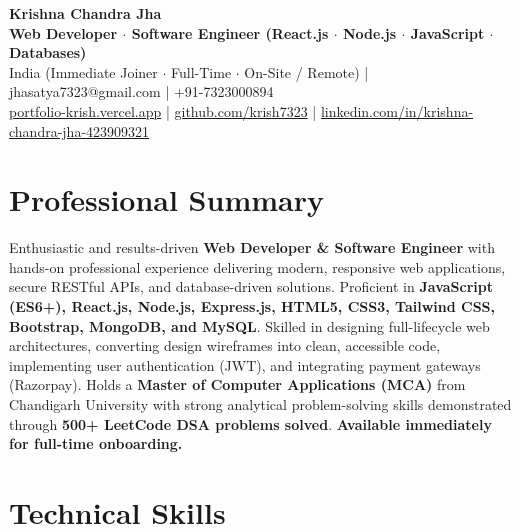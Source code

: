 \documentclass[a4paper,10pt]{article}
\begin{document}
\begin{center}

    {\LARGE \textbf{Krishna Chandra Jha}} \\[2.5pt]

    \textbf{Web Developer $\cdot$ Software Engineer (React.js $\cdot$ Node.js $\cdot$ JavaScript $\cdot$ Databases)} \\[3.5pt]

    India (Immediate Joiner $\cdot$ Full-Time $\cdot$ On-Site / Remote)
    \quad | \quad
    jhasatya7323@gmail.com
    \quad | \quad
    +91-7323000894
    \\[2.5pt]

    \href{https://portfolio-ashen-alpha-dv0whhsamo.vercel.app/}{portfolio-krish.vercel.app}
    \quad | \quad
    \href{https://github.com/krish7323}{github.com/krish7323}
    \quad | \quad
    \href{https://linkedin.com/in/krishna-chandra-jha-423909321}
    {linkedin.com/in/krishna-chandra-jha-423909321}

\end{center}

\section*{Professional Summary}

Enthusiastic and results-driven \textbf{Web Developer \& Software Engineer} with hands-on professional experience delivering modern, responsive web applications, secure RESTful APIs, and database-driven solutions. Proficient in \textbf{JavaScript (ES6+), React.js, Node.js, Express.js, HTML5, CSS3, Tailwind CSS, Bootstrap, MongoDB, and MySQL}. Skilled in designing full-lifecycle web architectures, converting design wireframes into clean, accessible code, implementing user authentication (JWT), and integrating payment gateways (Razorpay). Holds a \textbf{Master of Computer Applications (MCA)} from Chandigarh University with strong analytical problem-solving skills demonstrated through \textbf{500+ LeetCode DSA problems solved}. \textbf{Available immediately for full-time onboarding.}

\section*{Technical Skills}
\end{document}
